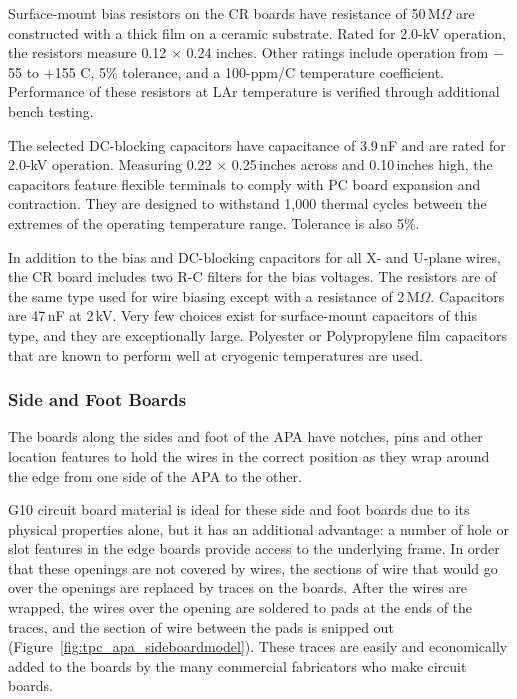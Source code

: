 Surface-mount bias resistors on the CR boards have resistance of 50\,M$\Omega$ are constructed with a thick film on a ceramic substrate. Rated for 2.0-kV operation, the resistors measure 0.12 $\times$ 0.24 inches. Other ratings include operation from $-$55 to +155 C, 5\% tolerance, and a 100-ppm/C temperature coefficient.
Performance of these resistors at LAr temperature is verified through additional bench testing.

The selected DC-blocking capacitors have capacitance of 3.9\,nF and are rated for 2.0-kV operation. Measuring 0.22 $\times$ 0.25\,inches across and 0.10\,inches high, the capacitors feature flexible terminals to comply with PC board expansion and contraction. They are designed to withstand 1,000 thermal cycles  
between the extremes of the operating temperature range. Tolerance is also 5\%.

In addition to the bias and DC-blocking capacitors for all X- and U-plane wires, the CR board includes two R-C filters for the bias voltages. The resistors are of the same type used for wire biasing except with a resistance of 2\,M$\Omega$. Capacitors are 47\,nF at 2\,kV. Very few choices exist for surface-mount capacitors of this type, and they are exceptionally large. 
Polyester or Polypropylene film capacitors that are known to perform well at cryogenic temperatures are used.


\subsubsection{Side and Foot Boards}

The boards along the sides and foot of the APA have notches, pins and other location features to hold the wires in the correct position as they wrap around the edge from one side of the APA to the other.

G10 circuit board material is ideal for these side and foot boards due to its physical properties alone, but it has an additional advantage: a number of hole or slot features in the edge boards provide access to the underlying frame.  In order that these openings are not covered by wires, the sections of wire that would go over the openings are replaced by traces on the boards.  After the wires are wrapped, the wires over the opening are soldered to pads at the ends of the traces, and the section of wire between the pads is snipped out (Figure~\ref{fig:tpc_apa_sideboardmodel}).  These traces are easily and economically added to the boards by the many commercial fabricators who make circuit boards. 

